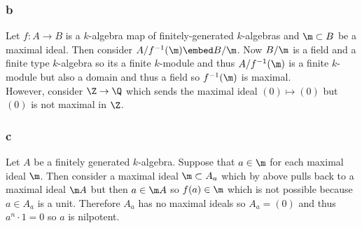 \documentclass[12pt]{article}
\begin{document}
\subsubsection{b}

Let $f : A \to B$ is a $k$-algebra map of finitely-generated $k$-algebras and $\m \subset B$ be a maximal ideal. Then consider $A / f^{-1}(\m) \embed B / \m$. Now $B / \m$ is a field and a finite type $k$-algebra so its a finite $k$-module and thus $A / f^{-1}(\m)$ is a finite $k$-module but also a domain and thus a field so $f^{-1}(\m)$ is maximal.
\bigskip\\
However, consider $\Z \to \Q$ which sends the maximal ideal $(0) \mapsto (0)$ but $(0)$ is not maximal in $\Z$.

\subsubsection{c}

Let $A$ be a finitely generated $k$-algebra. Suppose that $a \in \m$ for each maximal ideal $\m$. Then consider a maximal ideal $\m \subset A_a$ which by above pulls back to a maximal ideal $\m A$ but then $a \in \m A$ so $f(a) \in \m$ which is not possible because $a \in A_a$ is a unit. Therefore $A_a$ has no maximal ideals so $A_a = (0)$ and thus $a^n \cdot 1 = 0$ so $a$ is nilpotent.
\end{document}
